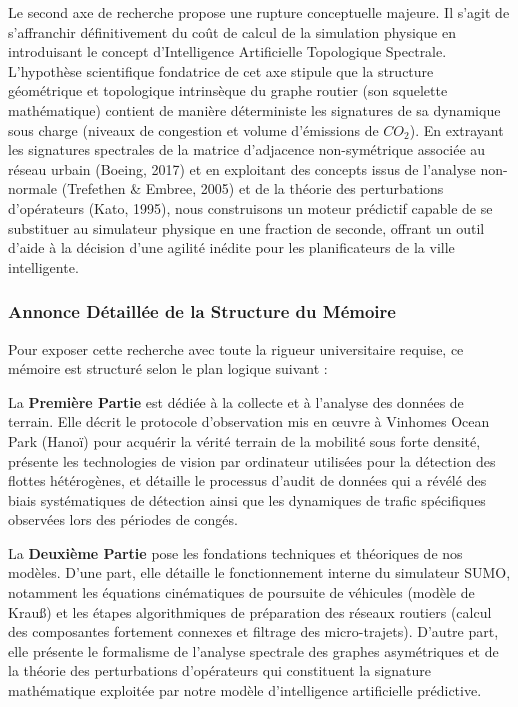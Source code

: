 \documentclass[11pt, a4paper]{article}
\begin{document}
Le second axe de recherche propose une rupture conceptuelle majeure. Il
s'agit de s'affranchir définitivement du coût de calcul de la simulation
physique en introduisant le concept d'Intelligence Artificielle
Topologique Spectrale. L'hypothèse scientifique fondatrice de cet axe
stipule que la structure géométrique et topologique intrinsèque du
graphe routier (son squelette mathématique) contient de manière
déterministe les signatures de sa dynamique sous charge (niveaux de
congestion et volume d'émissions de \(CO_2\)). En extrayant les
signatures spectrales de la matrice d'adjacence non-symétrique associée
au réseau urbain (Boeing, 2017) et en exploitant des concepts issus de
l'analyse non-normale (Trefethen \& Embree, 2005) et de la théorie des
perturbations d'opérateurs (Kato, 1995), nous construisons un moteur
prédictif capable de se substituer au simulateur physique en une
fraction de seconde, offrant un outil d'aide à la décision d'une agilité
inédite pour les planificateurs de la ville intelligente.

\subsubsection{Annonce Détaillée de la Structure du
Mémoire}\label{annonce-duxe9tailluxe9e-de-la-structure-du-muxe9moire}

Pour exposer cette recherche avec toute la rigueur universitaire
requise, ce mémoire est structuré selon le plan logique suivant :

La \textbf{Première Partie} est dédiée à la collecte et à l'analyse des
données de terrain. Elle décrit le protocole d'observation mis en œuvre
à Vinhomes Ocean Park (Hanoï) pour acquérir la vérité terrain de la
mobilité sous forte densité, présente les technologies de vision par
ordinateur utilisées pour la détection des flottes hétérogènes, et
détaille le processus d'audit de données qui a révélé des biais
systématiques de détection ainsi que les dynamiques de trafic
spécifiques observées lors des périodes de congés.

La \textbf{Deuxième Partie} pose les fondations techniques et théoriques
de nos modèles. D'une part, elle détaille le fonctionnement interne du
simulateur SUMO, notamment les équations cinématiques de poursuite de
véhicules (modèle de Krauß) et les étapes algorithmiques de préparation
des réseaux routiers (calcul des composantes fortement connexes et
filtrage des micro-trajets). D'autre part, elle présente le formalisme
de l'analyse spectrale des graphes asymétriques et de la théorie des
perturbations d'opérateurs qui constituent la signature mathématique
exploitée par notre modèle d'intelligence artificielle prédictive.
\end{document}
